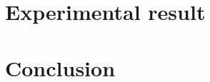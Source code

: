 \documentclass[review,onefignum,onetabnum]{siamonline190516}
\begin{document}

\section{Experimental result}\label{result}

\section{Conclusion}\label{conclusion}


\end{document}
